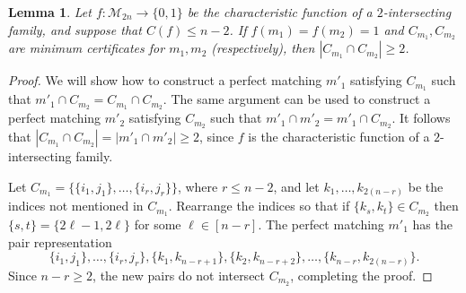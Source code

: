 \documentclass[10pt,a4paper]{article}
\newtheorem{lemma}[theorem]{Lemma}
\theoremstyle{definition}
\providecommand{\cM}{\mathcal{M}}
\begin{document}
\begin{lemma} \label{lem:2-int-coset-pms}
Let $f\colon \cM_{2n} \to \{0,1\}$ be the characteristic function of a $2$-intersecting family, and suppose that $C(f) \leq n-2$. If $f(m_1) = f(m_2) = 1$ and $C_{m_1},C_{m_2}$ are minimum certificates for $m_1,m_2$ (respectively), then $|C_{m_1} \cap C_{m_2}| \geq 2$.
\end{lemma}

\begin{proof}
We will show how to construct a perfect matching $m'_1$ satisfying $C_{m_1}$ such that $m'_1 \cap C_{m_2} = C_{m_1} \cap C_{m_2}$. The same argument can be used to construct a perfect matching $m'_2$ satisfying $C_{m_2}$ such that $m'_1 \cap m'_2 = m'_1 \cap C_{m_2}$. It follows that $|C_{m_1} \cap C_{m_2}| = |m'_1 \cap m'_2| \geq 2$, since $f$ is the characteristic function of a $2$-intersecting family.

Let $C_{m_1} = \bigl\{\{i_1,j_1\},\ldots,\{i_r,j_r\}\bigr\}$, where $r \leq n-2$, and let $k_1,\ldots,k_{2(n-r)}$ be the indices not mentioned in $C_{m_1}$. Rearrange the indices so that if $\{k_s,k_t\} \in C_{m_2}$ then $\{s,t\} = \{2\ell-1,2\ell\}$ for some $\ell \in [n-r]$. The perfect matching $m'_1$ has the pair representation
\[
 \{i_1,j_1\},\ldots,\{i_r,j_r\},\{k_1,k_{n-r+1}\},\{k_2,k_{n-r+2}\},\ldots,\{k_{n-r},k_{2(n-r)}\}.
\]
Since $n-r \geq 2$, the new pairs do not intersect $C_{m_2}$, completing the proof.
\end{proof}
\end{document}
